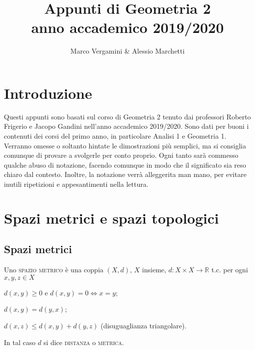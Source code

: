 \documentclass{article}
\title{Appunti di Geometria 2 \\ anno accademico 2019/2020}
\date{}
\author{Marco Vergamini \& Alessio Marchetti}
\begin{document}
\maketitle
\newpage
\tableofcontents
\newpage

\section{Introduzione}
Questi appunti sono basati sul corso di Geometria 2 tenuto dai professori
Roberto Frigerio e Jacopo Gandini nell'anno accademico 2019/2020. Sono dati per
buoni i contenuti dei corsi del primo anno, in particolare Analisi 1 e Geometria
1. Verranno omesse o soltanto hintate le dimostrazioni più semplici, ma si
consiglia comunque di provare a svolgerle per conto proprio. Ogni tanto sarà
commesso qualche abuso di notazione, facendo comunque in modo che il significato
sia reso chiaro dal contesto. Inoltre, la notazione verrà alleggerita man mano,
per evitare inutili ripetizioni e appesantimenti nella lettura.


\section{Spazi metrici e spazi topologici}
\subsection{Spazi metrici}
\begin{defn}
	Uno \textsc{spazio metrico} è una coppia $(X, d)$, $X$ insieme,
	${d: X \times X \rightarrow \mathbb{R}}$ t.c. per ogni ${x, y, z \in X}$
    \begin{nlist}
	\item $d(x, y) \ge 0$ e $d(x, y)=0 \Leftrightarrow x=y$;
	\item $d(x, y)=d(y, x)$;
	\item $d(x, z) \le d(x, y)+d(y,z)$ (disuguaglianza triangolare).
    \end{nlist}
	In tal caso $d$ si dice \textsc{distanza} o \textsc{metrica}.
\end{defn}
\end{document}
